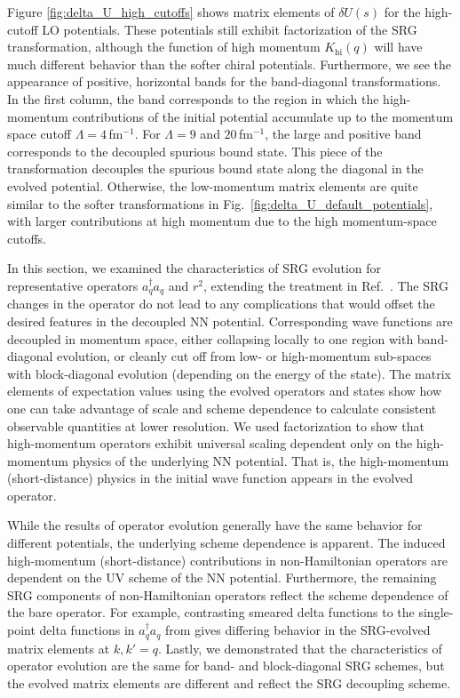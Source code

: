 \documentclass[10pt,aps,prc,floatfix,twocolumn,nofootinbib]{revtex4-1}
\newcommand{\ataq}{a^{\dagger}_q a_q}
\newcommand{\Khi}{K_{\text{hi}}}
\begin{document}
Figure \ref{fig:delta_U_high_cutoffs} shows matrix elements of $\delta U(s)$ for the high-cutoff LO potentials.
These potentials still exhibit factorization of the SRG transformation, although the function of high momentum $\Khi(q)$ will have much different behavior than the softer chiral potentials.
Furthermore, we see the appearance of positive, horizontal bands for the band-diagonal transformations.
In the first column, the band corresponds to the region in which the high-momentum contributions of the initial potential accumulate up to the momentum space cutoff $\Lambda=4$\,fm$^{-1}$.
For $\Lambda=9$ and $20$\,fm$^{-1}$, the large and positive band corresponds to the decoupled spurious bound state.
This piece of the transformation decouples the spurious bound state along the diagonal in the evolved potential.
Otherwise, the low-momentum matrix elements are quite similar to the softer transformations in Fig.~\ref{fig:delta_U_default_potentials}, with larger contributions at high momentum due to the high momentum-space cutoffs.


In this section, we examined the characteristics of SRG evolution for representative operators $\ataq$ and $r^2$, extending the treatment in Ref.~\cite{Anderson:2010aq}.
The SRG changes in the operator do not lead to any complications that would offset the desired features in the decoupled NN potential.
Corresponding wave functions are decoupled in momentum space, either collapsing locally to one region with band-diagonal evolution, or cleanly cut off from low- or high-momentum sub-spaces with block-diagonal evolution (depending on the energy of the state).
The matrix elements of expectation values using the evolved operators and states show how one can take advantage of scale and scheme dependence to calculate consistent observable quantities at lower resolution.
We used factorization to show that high-momentum operators exhibit universal scaling dependent only on the high-momentum physics of the underlying NN potential.
That is, the high-momentum (short-distance) physics in the initial wave function appears in the evolved operator.


While the results of operator evolution generally have the same behavior for different potentials, the underlying scheme dependence is apparent.
The induced high-momentum (short-distance) contributions in non-Hamiltonian operators are dependent on the UV scheme of the NN potential.
Furthermore, the remaining SRG components of non-Hamiltonian operators reflect the scheme dependence of the bare operator.
For example, contrasting smeared delta functions to the single-point delta functions in $\ataq$ from \cite{Anderson:2010aq} gives differing behavior in the SRG-evolved matrix elements at $k,k'=q$.
Lastly, we demonstrated that the characteristics of operator evolution are the same for band- and block-diagonal SRG schemes, but the evolved matrix elements are different and reflect the SRG decoupling scheme.
\end{document}
